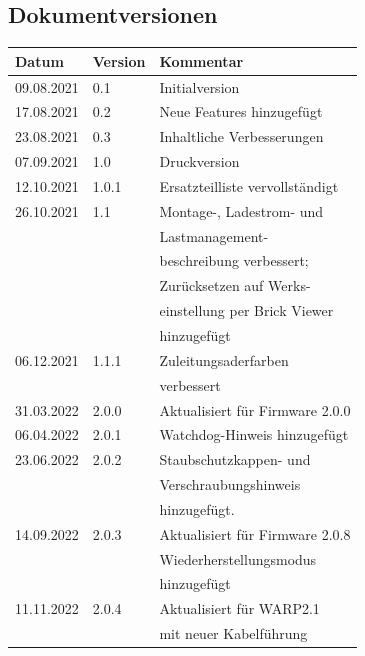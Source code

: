 \documentclass[a4paper,10pt]{article}
\begin{document}
\begin{multicols*}{2}
	\section{Dokumentversionen}
	\begin{tabular}{lll}
		\toprule
		Datum      & Version & Kommentar                       \\
		\midrule
		09.08.2021 & 0.1     & Initialversion                  \\
		17.08.2021 & 0.2     & Neue Features hinzugefügt       \\
		23.08.2021 & 0.3     & Inhaltliche Verbesserungen      \\
		07.09.2021 & 1.0     & Druckversion                    \\
		12.10.2021 & 1.0.1   & Ersatzteilliste vervollständigt \\
		26.10.2021 & 1.1     & Montage-, Ladestrom- und        \\
		           &         & Lastmanagement-                 \\
		           &         & beschreibung verbessert;        \\
		           &         & Zurücksetzen auf Werks-         \\
		           &         & einstellung per Brick Viewer    \\
		           &         & hinzugefügt                     \\
		06.12.2021 & 1.1.1   & Zuleitungsaderfarben            \\
		           &         & verbessert                      \\
		31.03.2022 & 2.0.0   & Aktualisiert für Firmware 2.0.0 \\
		06.04.2022 & 2.0.1   & Watchdog-Hinweis hinzugefügt    \\
		23.06.2022 & 2.0.2   & Staubschutzkappen- und          \\
		           &         & Verschraubungshinweis           \\
		           &         & hinzugefügt.                    \\
		14.09.2022 & 2.0.3   & Aktualisiert für Firmware 2.0.8 \\
		           &         & Wiederherstellungsmodus         \\
		           &         & hinzugefügt                     \\
		11.11.2022 & 2.0.4   & Aktualisiert für WARP2.1        \\
		           &         & mit neuer Kabelführung          \\

\end{tabular}
\end{multicols*}
\end{document}
